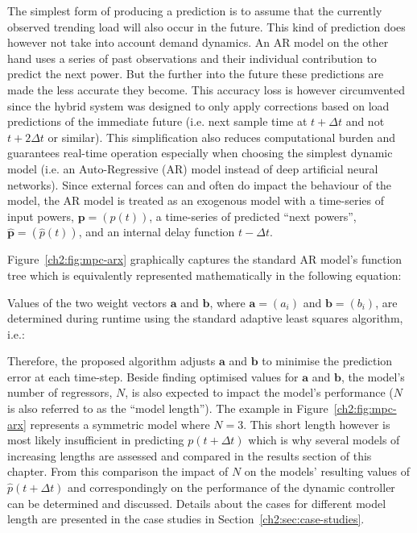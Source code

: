 The simplest form of producing a prediction is to assume that the currently observed trending load will also occur in the future.
This kind of prediction does however not take into account demand dynamics.
%
%
%
An AR model on the other hand uses a series of past observations and their individual contribution to predict the next power.
But the further into the future these predictions are made the less accurate they become.
This accuracy loss is however circumvented since the hybrid system was designed to only apply corrections based on load predictions of the immediate future (i.e. next sample time at $t+\Delta t$ and not $t+2\Delta t$ or similar).
This simplification also reduces computational burden and guarantees real-time operation especially when choosing the simplest dynamic model (i.e. an Auto-Regressive (AR) model instead of deep artificial neural networks).
Since external forces can and often do impact the behaviour of the model, the AR model is treated as an exogenous model with a time-series of input powers, $\textbf{p} = (p(t))$, a time-series of predicted ``next powers'', $\hat{\textbf{p}} = (\hat{p}(t))$, and an internal delay function $t-\Delta t$.



Figure~\ref{ch2:fig:mpc-arx} graphically captures the standard AR model's function tree which is equivalently represented mathematically in the following equation:



Values of the two weight vectors $\textbf{a}$ and $\textbf{b}$, where $\textbf{a} = (a_i)$ and $\textbf{b} = (b_i)$, are determined during runtime using the standard adaptive least squares algorithm, i.e.:



Therefore, the proposed algorithm adjusts $\textbf{a}$ and $\textbf{b}$ to minimise the prediction error at each time-step.
Beside finding optimised values for $\textbf{a}$ and $\textbf{b}$, the model's number of regressors, $N$, is also expected to impact the model's performance ($N$ is also referred to as the ``model length'').
The example in Figure~\ref{ch2:fig:mpc-arx} represents a symmetric model where $N=3$.
This short length however is most likely insufficient in predicting $p(t+\Delta t)$ which is why several models of increasing lengths are assessed and compared in the results section of this chapter.
From this comparison the impact of $N$ on the models' resulting values of $\hat{p}(t+\Delta t)$ and correspondingly on the performance of the dynamic controller can be determined and discussed.
Details about the cases for different model length are presented in the case studies in Section~\ref{ch2:sec:case-studies}.
